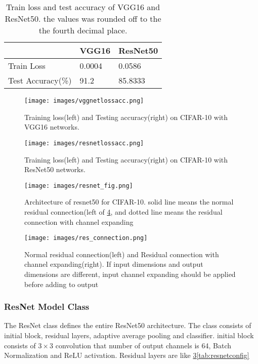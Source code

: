\documentclass[extendedabs]{bmvc2k}
\begin{document}
\begin{table}[]
\centering
\begin{tabular}{|l|l|l|}
\hline
                  & VGG16  & ResNet50 \\ \hline
Train Loss         & 0.0004  & 0.0586    \\ \hline
Test Accuracy(\%) & 91.2 & 85.8333   \\ \hline
\end{tabular}
\caption{Train loss and test accuracy of VGG16 and ResNet50. the values was rounded off to the the fourth decimal place.}
\label{tab:testresults}
\end{table}

\begin{figure}[t]
	\texttt{[image: images/vggnetlossacc.png]}
	\caption{Training loss(left) and Testing accuracy(right) on CIFAR-10\cite{cifar10} with VGG16 networks.}
 \label{fig:VGGNet16lossacc}
	\vspace{-2mm}
\end{figure}

\begin{figure}[t]
	\texttt{[image: images/resnetlossacc.png]}
	\caption{Training loss(left) and Testing accuracy(right) on CIFAR-10 with ResNet50 networks.}
 \label{fig:ResNetlossacc}
	\vspace{-2mm}
\end{figure}

\begin{figure}[htb!]
	\texttt{[image: images/resnet\_fig.png]}
	\caption{Architecture of resnet50 for CIFAR-10\cite{cifar10}. solid line means the normal residual connection(left of \ref{fig:resconnection}, and dotted line means the residual connection with channel expanding}
 \label{fig:resnetfig}
	\vspace{-2mm}
\end{figure}

\begin{figure}[htb!]
	\texttt{[image: images/res\_connection.png]}
	\caption{Normal residual connection(left) and Residual connection with channel expanding(right). If input dimensions and output dimensions are different, input channel expanding should be applied before adding to output}
 \label{fig:resconnection}
	\vspace{-2mm}
\end{figure}

\subsubsection{ResNet Model Class}
The ResNet class defines the entire ResNet50 architecture. The class consists of initial block, residual layers, adaptive average pooling and classifier. initial block consists of $3\times3$ convolution that number of output channels is 64, Batch Normalization and ReLU activation. Residual layers are like \ref{fig:resnetfig}\ref{tab:resnetconfig}
\end{document}
